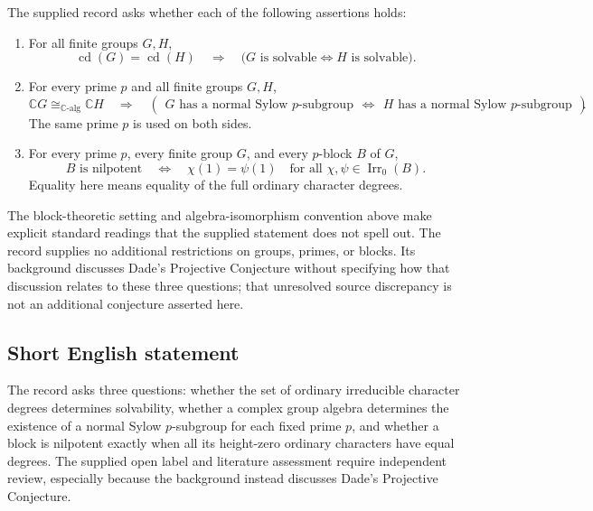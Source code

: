 \documentclass[11pt]{article}
\newcommand{\C}{\mathbb{C}}
\begin{document}
The supplied record asks whether each of the following assertions holds:
\begin{enumerate}
\item For all finite groups \(G,H\),
\[
\operatorname{cd}(G)=\operatorname{cd}(H)
\quad\Longrightarrow\quad
\bigl(G\text{ is solvable}\iff H\text{ is solvable}\bigr).
\]
\item For every prime \(p\) and all finite groups \(G,H\),
\[
\C G\cong_{\C\text{-alg}}\C H
\quad\Longrightarrow\quad
\left(
\begin{array}{c}
G\text{ has a normal Sylow }p\text{-subgroup}
\end{array}
\iff
\begin{array}{c}
H\text{ has a normal Sylow }p\text{-subgroup}
\end{array}
\right).
\]
The same prime \(p\) is used on both sides.
\item For every prime \(p\), every finite group \(G\), and every \(p\)-block \(B\) of \(G\),
\[
B\text{ is nilpotent}
\quad\Longleftrightarrow\quad
\chi(1)=\psi(1)\quad\text{for all }\chi,\psi\in\operatorname{Irr}_0(B).
\]
Equality here means equality of the full ordinary character degrees.
\end{enumerate}
The block-theoretic setting and algebra-isomorphism convention above make explicit standard readings that the supplied statement does not spell out. The record supplies no additional restrictions on groups, primes, or blocks. Its background discusses Dade's Projective Conjecture without specifying how that discussion relates to these three questions; that unresolved source discrepancy is not an additional conjecture asserted here.
\subsection{Short English statement}
The record asks three questions: whether the set of ordinary irreducible character degrees determines solvability, whether a complex group algebra determines the existence of a normal Sylow \(p\)-subgroup for each fixed prime \(p\), and whether a block is nilpotent exactly when all its height-zero ordinary characters have equal degrees. The supplied open label and literature assessment require independent review, especially because the background instead discusses Dade's Projective Conjecture.
\end{document}
